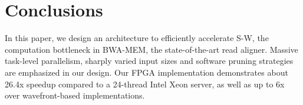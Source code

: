 \section{Conclusions} 
\label{sec:conclusions}
In this paper, we design an architecture to efficiently accelerate S-W, the computation bottleneck in BWA-MEM, the state-of-the-art read aligner. 
Massive task-level parallelism, sharply varied input sizes and software pruning strategies are emphasized in our design. 
Our FPGA implementation demonstrates about 26.4x speedup compared to a 24-thread Intel Xeon server, as well as up to 6x over wavefront-based implementations. 
